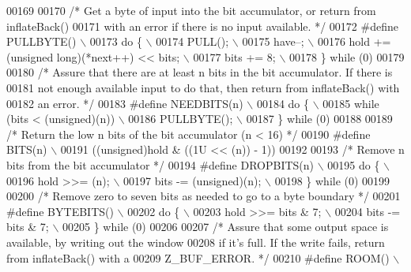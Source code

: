 \begin{DoxyCode}
00169 
00170 \textcolor{comment}{/* Get a byte of input into the bit accumulator, or return from inflateBack()}
00171 \textcolor{comment}{   with an error if there is no input available. */}
00172 \textcolor{preprocessor}{#define PULLBYTE() \(\backslash\)}
00173 \textcolor{preprocessor}{    do \{ \(\backslash\)}
00174 \textcolor{preprocessor}{        PULL(); \(\backslash\)}
00175 \textcolor{preprocessor}{        have--; \(\backslash\)}
00176 \textcolor{preprocessor}{        hold += (unsigned long)(*next++) << bits; \(\backslash\)}
00177 \textcolor{preprocessor}{        bits += 8; \(\backslash\)}
00178 \textcolor{preprocessor}{    \} while (0)}
00179 
00180 \textcolor{comment}{/* Assure that there are at least n bits in the bit accumulator.  If there is}
00181 \textcolor{comment}{   not enough available input to do that, then return from inflateBack() with}
00182 \textcolor{comment}{   an error. */}
00183 \textcolor{preprocessor}{#define NEEDBITS(n) \(\backslash\)}
00184 \textcolor{preprocessor}{    do \{ \(\backslash\)}
00185 \textcolor{preprocessor}{        while (bits < (unsigned)(n)) \(\backslash\)}
00186 \textcolor{preprocessor}{            PULLBYTE(); \(\backslash\)}
00187 \textcolor{preprocessor}{    \} while (0)}
00188 
00189 \textcolor{comment}{/* Return the low n bits of the bit accumulator (n < 16) */}
00190 \textcolor{preprocessor}{#define BITS(n) \(\backslash\)}
00191 \textcolor{preprocessor}{    ((unsigned)hold & ((1U << (n)) - 1))}
00192 
00193 \textcolor{comment}{/* Remove n bits from the bit accumulator */}
00194 \textcolor{preprocessor}{#define DROPBITS(n) \(\backslash\)}
00195 \textcolor{preprocessor}{    do \{ \(\backslash\)}
00196 \textcolor{preprocessor}{        hold >>= (n); \(\backslash\)}
00197 \textcolor{preprocessor}{        bits -= (unsigned)(n); \(\backslash\)}
00198 \textcolor{preprocessor}{    \} while (0)}
00199 
00200 \textcolor{comment}{/* Remove zero to seven bits as needed to go to a byte boundary */}
00201 \textcolor{preprocessor}{#define BYTEBITS() \(\backslash\)}
00202 \textcolor{preprocessor}{    do \{ \(\backslash\)}
00203 \textcolor{preprocessor}{        hold >>= bits & 7; \(\backslash\)}
00204 \textcolor{preprocessor}{        bits -= bits & 7; \(\backslash\)}
00205 \textcolor{preprocessor}{    \} while (0)}
00206 
00207 \textcolor{comment}{/* Assure that some output space is available, by writing out the window}
00208 \textcolor{comment}{   if it's full.  If the write fails, return from inflateBack() with a}
00209 \textcolor{comment}{   Z\_BUF\_ERROR. */}
00210 \textcolor{preprocessor}{#define ROOM() \(\backslash\)}

\end{DoxyCode}
